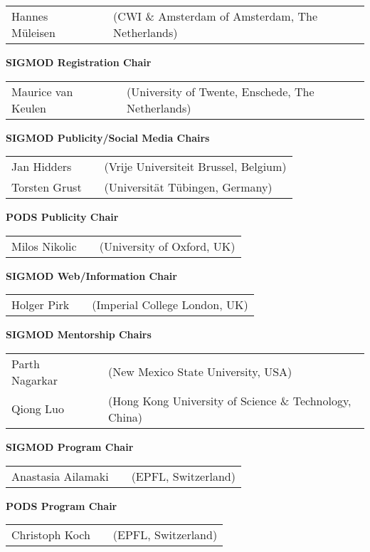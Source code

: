 {\begin{tabular}{lp{.5em}l}
Hannes M\"uleisen	&& \textsf{\small(CWI \& Amsterdam of Amsterdam, The Netherlands)}
\end{tabular}

\vfill
\textbf{SIGMOD Registration Chair}

\begin{tabular}{lp{.5em}l}
Maurice van Keulen	&& \textsf{\small(University of Twente, Enschede, The Netherlands)}
\end{tabular}

\vfill
\textbf{SIGMOD Publicity/Social Media Chairs}

\begin{tabular}{lp{.5em}l}
Jan Hidders	&& \textsf{\small(Vrije Universiteit Brussel, Belgium)}	\\
Torsten Grust	&& \textsf{\small(Universität Tübingen, Germany)}
\end{tabular}

\vfill
\textbf{PODS Publicity Chair}

\begin{tabular}{lp{.5em}l}
Milos Nikolic	&& \textsf{\small(University of Oxford, UK)}
\end{tabular}

\vfill
\textbf{SIGMOD Web/Information Chair}

\begin{tabular}{lp{.5em}l}
Holger Pirk	&& \textsf{\small(Imperial College London, UK)}
\end{tabular}

\vfill
\textbf{SIGMOD Mentorship Chairs}

\begin{tabular}{lp{.5em}l}
Parth Nagarkar	&& \textsf{\small(New Mexico State University, USA)}	\\
Qiong Luo	&& \textsf{\small(Hong Kong University of Science \& Technology, China)}
\end{tabular}

\pagebreak

\textbf{SIGMOD Program Chair}

\begin{tabular}{lp{.5em}l}
Anastasia Ailamaki	&& \textsf{\small(EPFL, Switzerland)}
\end{tabular}

\vfill
\textbf{PODS Program Chair}

\begin{tabular}{lp{.5em}l}
Christoph Koch	&& \textsf{\small(EPFL, Switzerland)}
\end{tabular}

}

